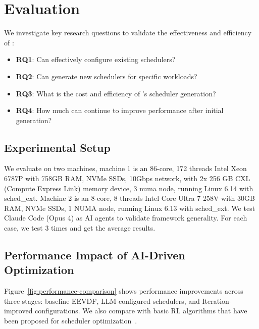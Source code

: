 \section{Evaluation}
\label{sec:evaluation}


We investigate key research questions to validate the effectiveness and efficiency of \sys:

\begin{itemize}
\item \textbf{RQ1}: Can \sys effectively configure existing schedulers?
\item \textbf{RQ2}: Can \sys generate new schedulers for specific workloads?
\item \textbf{RQ3}: What is the cost and efficiency of \sys's scheduler generation?
\item \textbf{RQ4}: How much can \agent continue to improve performance after initial generation?
\end{itemize}

\subsection{Experimental Setup}

We evaluate \sys on two machines, machine 1 is an 86-core, 172 threads Intel Xeon 6787P with 758GB RAM, NVMe SSDs, 10Gbps network, with 2x 256 GB CXL (Compute Express Link) memory device, 3 numa node, running Linux 6.14 with sched\_ext. Machine 2 is an 8-core, 8 threads Intel Core Ultra 7 258V with 30GB RAM, NVMe SSDs, 1 NUMA node, running Linux 6.13 with sched\_ext. We test Claude Code (Opus 4) as AI agents to validate framework generality. For each case, we test 3 times and get the average results.

\subsection{Performance Impact of AI-Driven Optimization}

Figure~\ref{fig:performance-comparison} shows performance improvements across three stages: baseline EEVDF, LLM-configured schedulers, and Iteration-improved configurations. We also compare with basic RL algorithms that have been proposed for scheduler optimization~\cite{corbet2025ml}.

